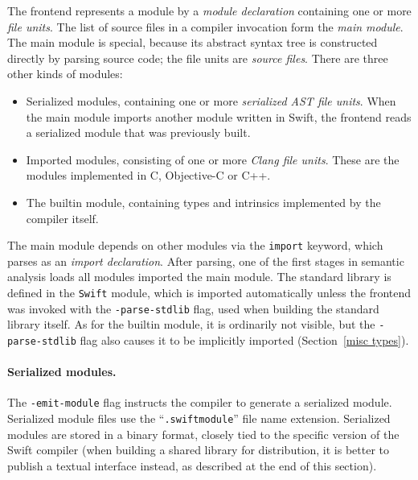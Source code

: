 \documentclass[../generics]{subfiles}
\begin{document}
The frontend represents a module by a \emph{module declaration} containing one or more \emph{file units}. The list of source files in a compiler invocation form the \emph{main module}. The main module is special, because its abstract syntax tree is constructed directly by parsing source code; the file units are \emph{source files}. There are three other kinds of modules:
\begin{itemize}
\item Serialized modules, containing one or more \emph{serialized AST file units}. When the main module imports another module written in Swift, the frontend reads a serialized module that was previously built.

\item Imported modules, consisting of one or more \emph{Clang file units}. These are the modules implemented in C, Objective-C or C++.

\item The builtin module, containing types and intrinsics implemented by the compiler itself.
\end{itemize}
The main module depends on other modules via the \texttt{import} keyword, which parses as an \emph{import declaration}. After parsing, one of the first stages in semantic analysis loads all modules imported the main module. The standard library is defined in the \texttt{Swift} module, which is imported automatically unless the frontend was invoked with the \texttt{-parse-stdlib} flag, used when building the standard library itself. As for the builtin module, it is ordinarily not visible, but the \texttt{-parse-stdlib} flag also causes it to be implicitly imported (Section~\ref{misc types}).

\paragraph{Serialized modules.} The \texttt{-emit-module} flag instructs the compiler to generate a serialized module. Serialized module files use the ``\texttt{.swiftmodule}'' file name extension. Serialized modules are stored in a binary format, closely tied to the specific version of the Swift compiler (when building a shared library for distribution, it is better to publish a textual interface instead, as described at the end of this section).
\end{document}
